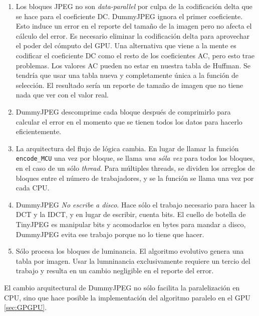 \begin{enumerate}
    \item{Los bloques JPEG no son \emph{data-parallel} por culpa de la
        codificación delta que se hace para el coeficiente DC. DummyJPEG ignora
    el primer coeficiente. Esto induce un error en el reporte del tamaño de la imagen pero no afecta el cálculo del error. Es necesario eliminar la codificación delta para aprovechar el poder del cómputo del GPU. Una alternativa que viene a la mente es codificar el coeficiente DC como el resto de los coeficientes AC, pero esto trae problemas. Los valores AC pueden no estar en nuestra tabla de Huffman. Se tendría que usar una tabla nueva y completamente única a la función de selección. El resultado sería un reporte de tamaño de imagen que no tiene nada que ver con el valor real.}

    \item{DummyJPEG descomprime cada bloque después de comprimirlo para
        calcular el error en el momento que se tienen todos los datos para
    hacerlo eficientemente.}

    \item{La arquitectura del flujo de lógica cambia. En lugar de llamar la
        función \verb+encode_MCU+ una vez por bloque, se llama \emph{una sóla
    vez} para todos los bloques, en el caso de un sólo \emph{thread}. Para
múltiples threads, se dividen los arreglos de bloques entre el número de
trabajadores, y se la función se llama una vez por cada CPU.}

    \item{DummyJPEG \emph{No escribe a disco}. Hace sólo el trabajo necesario
        para hacer la DCT y la IDCT, y en lugar de escribir, cuenta bits. El
    cuello de botella de TinyJPEG es manipular bits y acomodarlos en bytes para
mandar a disco, DummyJPEG evita ese trabajo porque no lo tiene que hacer.}

    \item{Sólo procesa los bloques de luminancia. El algoritmo evolutivo genera
        una tabla por imagen. Usar la lumninancia exclusivamente requiere un
    tercio del trabajo y resulta en un cambio negligible en el reporte del
error.}
\end{enumerate}

El cambio arquitectural de DummyJPEG no sólo facilita la paralelización en CPU,
sino que hace posible la implementación del algoritmo paralelo en el GPU
\ref{sec:GPGPU}.


